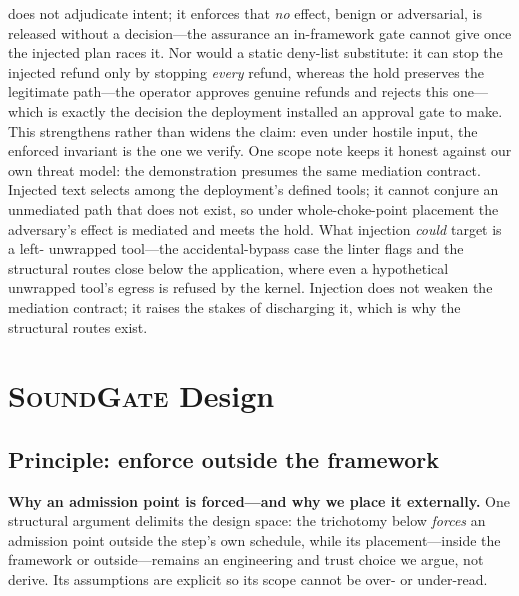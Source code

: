 \documentclass[10pt,journal,compsoc]{IEEEtran}
\newcommand{\sys}{\textsc{SoundGate}}
\begin{document}
does not adjudicate intent; it enforces that \emph{no} effect, benign or
adversarial, is released without a decision---the assurance an in-framework gate
cannot give once the injected plan races it. Nor would a static deny-list
substitute: it can stop the injected refund only by stopping \emph{every}
refund, whereas the hold preserves the legitimate path---the operator approves
genuine refunds and rejects this one---which is exactly the decision the
deployment installed an approval gate to make. This strengthens rather than widens
the claim: even under hostile input, the enforced invariant is the one we
verify. One scope note keeps it honest against our own threat model: the
demonstration presumes the same mediation contract. Injected text selects among
the deployment's defined tools; it cannot conjure an unmediated path that does
not exist, so under whole-choke-point placement the adversary's effect is
mediated and meets the hold. What injection \emph{could} target is a left-%
unwrapped tool---the accidental-bypass case the linter flags and the structural
routes close below the application, where even a hypothetical unwrapped tool's
egress is refused by the kernel. Injection does not weaken the mediation
contract; it raises the stakes of discharging it, which is why the structural
routes exist.

\section{\sys{} Design}
\label{sec:design}

\subsection{Principle: enforce outside the framework}
\noindent\textbf{Why an admission point is forced---and why we place it
externally.} One structural argument delimits the design space: the trichotomy below \emph{forces} an admission point outside the step's own schedule, while its placement---inside the framework or outside---remains an engineering and trust choice we argue, not derive. Its assumptions are explicit so its scope cannot be over- or under-read.
\end{document}

